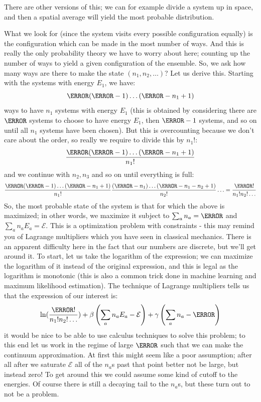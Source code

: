 There are other versions of this; we can for example divide a system up in space, and then a spatial average will yield the most probable distribution.

What we look for (since the system visits every possible configuration equally) is the configuration which can be made in the most number of ways. And this is really the only probability theory we have to worry about here; counting up the number of ways to yield a given configuration of the ensemble. So, we ask how many ways are there to make the state $(n_1, n_2, \ldots)$? Let us derive this. Starting with the systems with energy $E_1$, we have:
\begin{equation}
    \N(\N-1) \ldots (\N - n_1 + 1)
\end{equation}
ways to have $n_1$ systems with energy $E_1$ (this is obtained by considering there are $\N$ systems to choose to have energy $E_1$, then $\N - 1$ systems, and so on until all $n_1$ systems have been chosen). But this is overcounting because we don't care about the order, so really we require to divide this by $n_1!$:
\begin{equation}
    \frac{\N(\N-1) \ldots (\N - n_1 + 1)}{n_1!}
\end{equation}
and we continue with $n_2, n_3$ and so on until everything is full:
\begin{equation}
    \frac{\N(\N-1) \ldots (\N - n_1 + 1)}{n_1!} \frac{(\N - n_1) \ldots (\N - n_1 - n_2 + 1)}{n_2!} \ldots = \frac{\N!}{n_1!n_2!\ldots}
\end{equation}
So, the most probable state of the system is that for which the above is maximized; in other words, we maximize it subject to $\sum_{a} n_a = \N$ and $\sum_a n_a E_a = \mathcal{E}$. This is a optimization problem with constraints - this may remind you of Lagrange multipliers which you have seen in classical mechanics. There is an apparent difficulty here in the fact that our numbers are discrete, but we'll get around it. To start, let us take the logarithm of the expression; we can maximize the logarithm of it instead of the original expression, and this is legal as the logarithm is monotonic (this is also a common trick done in machine learning and maximum likelihood estimation). The technique of Lagrange multipliers tells us that the expression of our interest is:
\begin{equation}\label{eq-Lagrangemults}
    \ln(\frac{\N!}{n_1!n_2! \ldots}) + \beta\left(\sum_a n_a E_a - \mathcal{E}\right) + \gamma\left(\sum_a n_a - \N\right)
\end{equation}
it would be nice to be able to use calculus techniques to solve this problem; to this end let us work in the regime of large $\N$ such that we can make the continuum approximation. At first this might seem like a poor assumption; after all after we saturate $\mathcal{E}$ all of the $n_a$s past that point better not be large, but instead zero! To get around this we could assume some kind of cutoff to the energies. Of course there is still a decaying tail to the $n_a$s, but these turn out to not be a problem.

